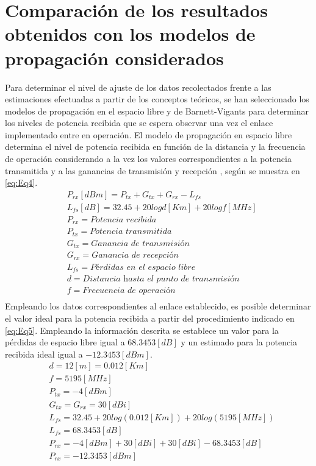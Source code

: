 \documentclass[conference]{IEEEtran}
\begin{document}
\section{Comparación de los resultados obtenidos con los modelos de propagación considerados}
Para determinar el nivel de ajuste de los datos recolectados frente a las estimaciones efectuadas a partir de 
los conceptos teóricos, se han seleccionado los modelos de propagación en el espacio libre y de Barnett-Vigants
para determinar los niveles de potencia recibida que se espera observar una vez el enlace implementado entre en operación.
El modelo de propagación en espacio libre determina el nivel de potencia recibida en función de la distancia y la 
frecuencia de operación considerando a la vez los valores correspondientes a la potencia transmitida y a las ganancias
de transmisión y recepción \cite{b2}, según se muestra en \ref{eq:Eq4}. 
\begin{equation}
    \label{eq:Eq4}
    \begin{aligned}
        &P_{rx}[dBm] = P_{tx} + G_{tx} + G_{rx} - L_{fs}\\
        &L_{fs}[dB] = 32.45+20logd[Km]+20logf[MHz]\\
        &P_{rx} = \textit{Potencia recibida}\\
        &P_{tx} = \textit{Potencia transmitida}\\
        &G_{tx} = \textit{Ganancia de transmisión}\\
        &G_{rx} = \textit{Ganancia de recepción}\\
        &L_{fs} = \textit{Pérdidas en el espacio libre}\\
        &d = \textit{Distancia hasta el punto de transmisión}\\
        &f = \textit{Frecuencia de operación}\\
    \end{aligned}
\end{equation}
Empleando los datos correspondientes al enlace establecido, es posible determinar el valor ideal para la potencia recibida 
a partir del procedimiento indicado en \ref{eq:Eq5}. Empleando la información descrita se establece un valor para la pérdidas de espacio libre
igual a $68.3453[dB]$ y un estimado para la potencia recibida ideal igual a $-12.3453[dBm]$.
\begin{equation}
    \label{eq:Eq5}
    \begin{aligned}
        &d = 12[m] = 0.012[Km]\\
        &f = 5195[MHz]\\
        &P_{tx} = -4[dBm]\\
        &G_{tx} = G_{rx} = 30[dBi]\\
        &L_{fs} = 32.45+20log(0.012[Km])+20log(5195[MHz])\\
        &L_{fs} = 68.3453[dB]\\
        &P_{rx} = -4[dBm] + 30[dBi] + 30[dBi] - 68.3453[dB]\\
        &P_{rx} = -12.3453[dBm]
    \end{aligned}
\end{equation}
\end{document}
